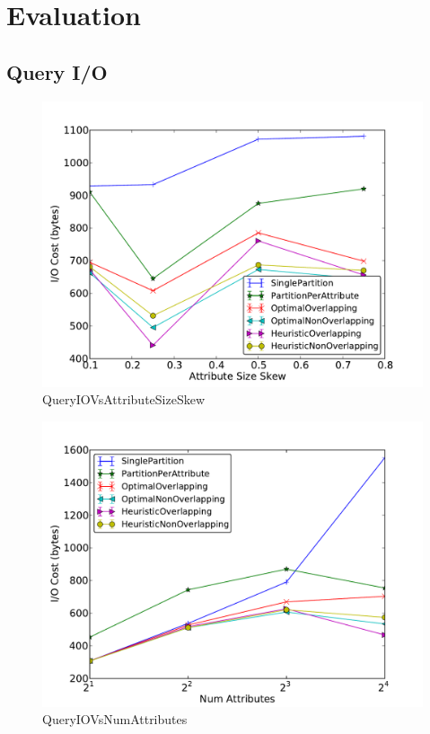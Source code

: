 \section{Evaluation}


\subsection{Query I/O}

\begin{figure}[ht]
\centerline{\includegraphics[width=0.9\columnwidth]{figures/QueryIOVsAttributeSizeSkew.pdf}}
\caption{QueryIOVsAttributeSizeSkew}
\end{figure}

\begin{figure}[ht]
\centerline{\includegraphics[width=0.9\columnwidth]{figures/QueryIOVsNumAttributes.pdf}}
 \caption{QueryIOVsNumAttributes}
 \end{figure}

